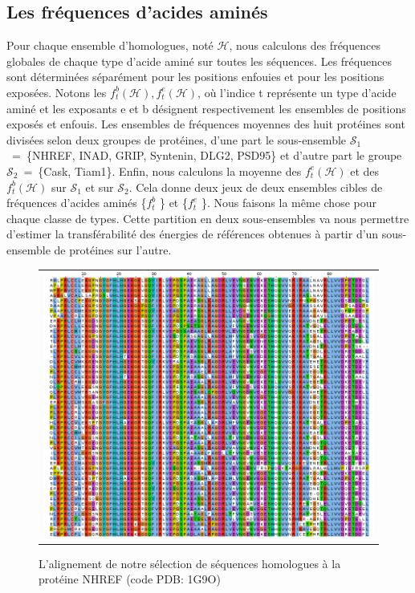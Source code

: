 \subsection{Les fréquences d'acides aminés}

Pour chaque ensemble d'homologues, noté $\mathcal{H}$, nous calculons des fréquences globales de chaque type d'acide aminé sur toutes les séquences. Les fréquences sont déterminées séparément pour les positions enfouies et pour les positions exposées. Notons les ${f^b_t(\mathcal{H}), f^e_t(\mathcal{H})}$, où l'indice t représente un type d'acide aminé et les exposants e et b désignent respectivement les ensembles de positions exposés et enfouis. Les ensembles de fréquences moyennes des huit protéines sont divisées selon deux groupes de protéines, d'une part le sous-ensemble $\mathcal{S}_1$~=~\{NHREF, INAD, GRIP, Syntenin, DLG2, PSD95\} et d'autre part le groupe $\mathcal{S}_2$~=~\{Cask, Tiam1\}. Enfin, nous calculons la moyenne des $f^e_t(\mathcal{H})$ et des $f^b_t(\mathcal{H})$ sur $\mathcal{S}_1$ et sur $\mathcal{S}_2$. Cela donne deux jeux de deux ensembles cibles de fréquences d'acides aminés \{$f^b_t$ \} et \{$f^e_t$ \}. Nous faisons la même chose pour chaque classe de types. Cette partition en deux sous-ensembles va nous permettre d'estimer la transférabilité des énergies de références obtenues à partir d'un sous-ensemble de protéines sur l'autre.
\label{subsection:freqaa}
        

   \begin{figure}[t]
     \centering
     \begin{tabular}{c}
       \includegraphics[width=17cm]{homologues/1G9O.png} \\
     \end{tabular}
     \caption{L'alignement de notre sélection de séquences homologues à la protéine NHREF (code PDB: 1G9O)}
\label{align_homo:NHREF}
   \end{figure}

